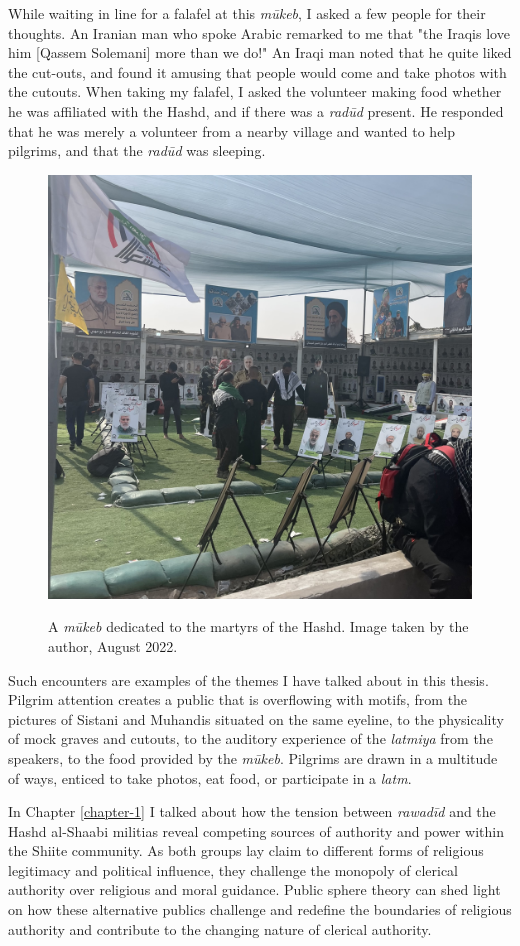 While waiting in line for a falafel at this \emph{mūkeb}, I asked a few people for their thoughts. An Iranian man who spoke Arabic remarked to me that "the Iraqis love him [Qassem Solemani] more than we do!" An Iraqi man noted that he quite liked the cut-outs, and found it amusing that people would come and take photos with the cutouts. When taking my falafel, I asked the volunteer making food whether he was affiliated with the Hashd, and if there was a \emph{radūd} present. He responded that he was merely a volunteer from a nearby village and wanted to help pilgrims, and that the \emph{radūd} was sleeping. 

\begin{figure}[h]
\caption{A \emph{mūkeb} dedicated to the martyrs of the Hashd. Image taken by the author, August 2022.}
\centering
\includegraphics[width=.75\textwidth]{images/qassem-mowkeb.jpeg}
\label{fig:qassem-mowkeb}
\end{figure}

Such encounters are examples of the themes I have talked about in this thesis. Pilgrim attention creates a public that is overflowing with motifs, from the pictures of Sistani and Muhandis situated on the same eyeline, to the physicality of mock graves and cutouts, to the auditory experience of the \emph{latmiya} from the speakers, to the food provided by the \emph{mūkeb}. Pilgrims are drawn in a multitude of ways, enticed to take photos, eat food, or participate in a \emph{latm}. 

In Chapter \ref{chapter-1} I talked about how the tension between \emph{rawadīd} and the Hashd al-Shaabi militias reveal competing sources of authority and power within the Shiite community. As both groups lay claim to different forms of religious legitimacy and political influence, they challenge the monopoly of clerical authority over religious and moral guidance. Public sphere theory can shed light on how these alternative publics challenge and redefine the boundaries of religious authority and contribute to the changing nature of clerical authority. 

